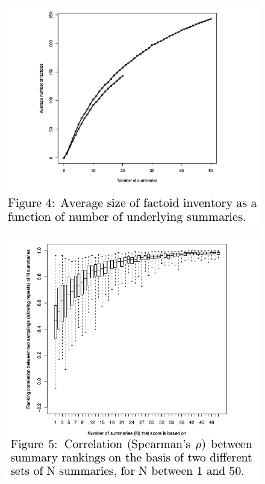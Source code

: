 \documentclass[xcolor={table}]{beamer}
\begin{document}
\begin{frame}[t]{\cite{teufel2004evaluating}}
      \begin{figure}[h]
          \centering
      \includegraphics[scale=.35]{images/figure4-teufel04.png} \\
  \end{figure}
\end{frame}
\begin{frame}[t]{\cite{teufel2004evaluating}}
      \begin{figure}[h]
          \centering
      \includegraphics[scale=.25]{images/figure5-teufel04.png} \\
  \end{figure}
\end{frame}
\end{document}
